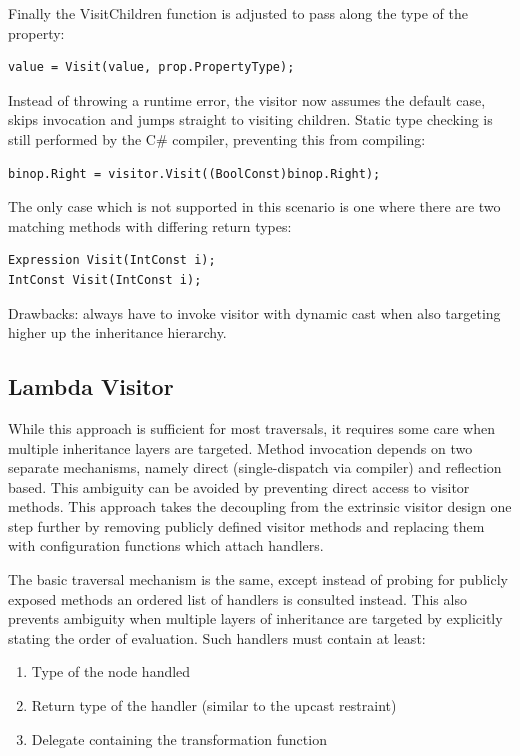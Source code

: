 \documentclass[twoside,openright]{uva-bachelor-thesis}
\begin{document}
			Finally the VisitChildren function is adjusted to pass along the type of the property:
			\begin{lstlisting}[caption=Spanning tree broadcast algorithm.]
value = Visit(value, prop.PropertyType);
			\end{lstlisting}
			
			Instead of throwing a runtime error, the visitor now assumes the default case, skips invocation and jumps straight to visiting children. Static type checking is still performed by the C\# compiler, preventing this from compiling:
			\begin{lstlisting}[caption=Spanning tree broadcast algorithm.]
binop.Right = visitor.Visit((BoolConst)binop.Right);
			\end{lstlisting}
			
			The only case which is not supported in this scenario is one where there are two matching methods with differing return types:
			\begin{lstlisting}[caption=Spanning tree broadcast algorithm.]
Expression Visit(IntConst i);
IntConst Visit(IntConst i);
			\end{lstlisting}
			
			Drawbacks: always have to invoke visitor with dynamic cast when also targeting higher up the inheritance hierarchy.
			
		\subsection{Lambda Visitor}
			While this approach is sufficient for most traversals, it requires some care when multiple inheritance layers are targeted. Method invocation depends on two separate mechanisms, namely direct (single-dispatch via compiler) and reflection based. This ambiguity can be avoided by preventing direct access to visitor methods. This approach takes the decoupling from the extrinsic visitor design one step further by removing publicly defined visitor methods and replacing them with configuration functions which attach handlers.
			
			The basic traversal mechanism is the same, except instead of probing for publicly exposed methods an ordered list of handlers is consulted instead. This also prevents ambiguity when multiple layers of inheritance are targeted by explicitly stating the order of evaluation. Such handlers must contain at least:
			\begin{enumerate}
				\item Type of the node handled
				\item Return type of the handler (similar to the upcast restraint)
				\item Delegate containing the transformation function
			\end{enumerate}
			
\end{document}
